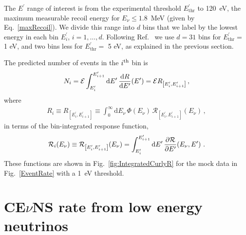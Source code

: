 \documentclass[a4paper,11pt]{article}
\renewcommand\({\left(}
\renewcommand\){\right)}
\renewcommand\[{\left[}
\renewcommand\]{\right]}
\newcommand{\tx}{\text}
\newcommand{\df}{\text{d}}
\newcommand{\al}[1]{\begin{align}#1\end{align}}
\newcommand{\paren}[1]{\left(#1\right)}
\newcommand{\sqbr}[1]{\left[#1\right]}
\newcommand{\fn}[1]{\!\paren{#1}} %
\newcommand{\p}{\partial}
\theoremstyle{definition}
\newcommand{\ov}{\over}
\newcommand{\mc}{\mathcal}
\newcommand{\pr}{\prime}
\begin{document}
The $E^{\pr}$ range of interest is from the experimental threshold $E^{\pr}_{\tx{thr}}$ to 120~eV, the maximum measurable recoil energy for $E_\nu \leq 1.8$~MeV (given by Eq.~\eqref{maxRecoil}).
We divide this range into $d$ bins that we label by the lowest energy in each bin $E^{\pr}_i$, $i = 1, \ldots, d$.
Following Ref.~\cite{Liao:2023kyy} we use $d=31$ bins
for $E^{\pr}_{\tx{thr}}=$ 1 eV, and two bins less for $E^{\pr}_{\tx{thr}}=$ 5 eV, as explained in the previous section. 

The predicted number of events in the $i^{\rm th}$ bin is
\al{
    N_i = \mc E \int_{E^{\pr}_i}^{E^{\pr}_{i+1}} \df E^\pr\, {\df R\ov \df E^\pr}\fn{E^\pr} = \mc E R_{\sqbr{E^\pr_i, E^\pr_{i+1}}}\,,
\label{recoilrateSim}
}
where    
\al{
    R_i \equiv R_{\sqbr{E^\pr_i, E^\pr_{i+1}}} \equiv \int_0^\infty \df E_\nu\, \Phi\fn{E_\nu}\, \mc R_{\sqbr{E^\pr_i, E^\pr_{i+1}}}\fn{E_\nu}\,,
\label{masterEquation}
}
 in terms of the bin-integrated response function,
\al{
    \mc R_i(E_\nu) \equiv \mc R_{\sqbr{E^\pr_i, E^\pr_{i+1}}}\fn{E_\nu} = \int_{E^\pr_i}^{E^\pr_{i+1}} \df E^\pr\, {\p\mc R\ov \p E^\pr}\fn{E_\nu, E^\pr}\,.
    \label{Bin-IntegratedCurlyR}   
}
These functions are shown in Fig.~\ref{fig:IntegratedCurlyR} for the mock data in Fig.~\ref{EventRate} with a 1~eV threshold.

\section{CE$\nu$NS rate from low energy neutrinos}
\label{sec:low-energy-neutrino flux}
\end{document}
